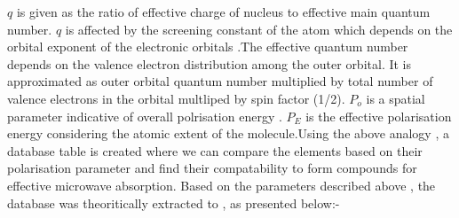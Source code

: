 \documentclass[journal]{IEEEtran}
\begin{document}
$q$ is given as the ratio of effective charge of nucleus to effective main quantum number. $q$ is affected by the screening constant of the atom which depends on the orbital exponent of the electronic orbitals \cite{clementi1963atomic} .The effective quantum number depends on the valence electron distribution among the outer orbital. It is approximated as outer orbital quantum number multiplied by total number of valence electrons in the orbital multliped by spin factor (1/2). $P_o$ is a spatial parameter indicative of overall polrisation energy . $P_E $ is the effective polarisation energy considering the atomic extent of the molecule.Using the above analogy , a database table is created where we can compare the elements based on their polarisation parameter and find their compatability to form compounds for effective microwave absorption.
Based on the parameters described above , the database was theoritically extracted to , as presented below:-

\end{document}
